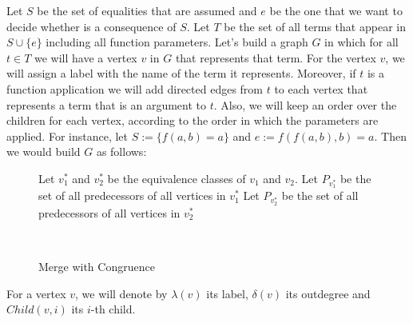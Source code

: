 Let $S$ be the set of equalities that are assumed and $e$ be the one that we want to decide whether is a consequence of $S$. Let $T$ be the set of all terms that appear in $S \cup \{e\}$ including all function parameters. Let's build a graph $G$ in which for all $t \in T$ we will have a vertex $v$ in $G$ that represents that term. For the vertex $v$, we will assign a label with the name of the term it represents. Moreover, if $t$ is a function application we will add directed edges from $t$ to each vertex that represents a term that is an argument to $t$. Also, we will keep an order over the children for each vertex, according to the order in which the parameters are applied. For instance, let $S := \{f(a, b) = a\}$ and $e := f(f(a, b), b) = a$. Then we would build $G$ as follows:

\renewcommand{\algorithmicforall}{\textbf{for each}}
\MakeRobust{\Call}

\begin{figure}[t]
\begin{algorithmic}[1]
    \State Let $v_{1}^{*}$ and $v_{2}^{*}$ be the equivalence classes of $v_{1}$ and $v_{2}$.
    \State Let $P_{v_{1}^{*}}$ be the set of all predecessors of all vertices in $v_{1}^{*}$
    \State Let $P_{v_{2}^{*}}$ be the set of all predecessors of all vertices in $v_{2}^{*}$
    \State{}
        \State {}
      \EndIf
    \EndFor
  \EndIf
  \EndProcedure
\end{algorithmic}
\caption{Merge with Congruence}~\label{merge_cong}
\end{figure}

\begin{figure}[h]
\centering
{}
\end{figure}

For a vertex $v$, we will denote by $\lambda(v)$ its label, $\delta(v)$ its outdegree and $Child(v, i)$ its $i$-th child.

